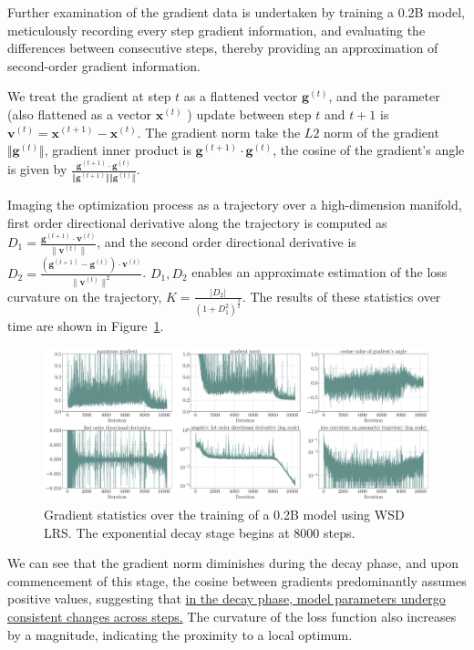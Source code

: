 Further examination of the gradient data is undertaken by training a 0.2B model, meticulously recording every step gradient information, and evaluating the differences between consecutive steps, thereby providing an approximation of second-order gradient information.

We treat the gradient at step $t$ as a flattened vector $\mathbf{g}^{(t)}$, and the parameter (also flattened as a vector $\mathbf{x}^{(t)}$ ) update between step $t$ and $t+1$ is $\mathbf{v}^{(t)} = \mathbf{x}^{(t+1)} - \mathbf{x}^{(t)}$. The gradient norm take the $L2$ norm of the gradient $\Vert\mathbf{g}^{(t)} \Vert$, gradient inner product is $\mathbf{g}^{(t+1)} \cdot \mathbf{g}^{(t)}$, the cosine of the gradient's angle is given by $\frac{\mathbf{g}^{(t+1)} \cdot \mathbf{g}^{(t)}}  {\Vert\mathbf{g}^{(t+1)} \Vert \Vert\mathbf{g}^{(t)} \Vert}$.

Imaging the optimization process as a trajectory over a high-dimension manifold, first order directional derivative along the trajectory is computed as $D_1 = \frac{\mathbf{g}^{(t+1)} \cdot \mathbf{v}^{(t)}}{\|\mathbf{v}^{(t)}\|}
$, and the second order directional derivative is $D_2 = \frac{(\mathbf{g}^{(t+1)} - \mathbf{g}^{(t)}) \cdot \mathbf{v}^{(t)}}{\|\mathbf{v}^{(t)}\|^2}$. $D_1, D_2$ enables an approximate estimation of the loss curvature on the trajectory, $K = \frac{|D_2|}{(1 + D_1^2)^{\frac{3}{2}}}$. The results of these statistics over time are shown in Figure~\ref{fig:grad}.

\begin{figure}[htbp]
    \centering
    \includegraphics[width=1.0\linewidth]{Fig/grad.pdf}
    \caption{Gradient statistics over the training of a 0.2B model using WSD LRS. The exponential decay stage begins at 8000 steps.}
    \label{fig:grad}
\end{figure}

We can see that the gradient norm diminishes during the decay phase, and upon commencement of this stage, the cosine between gradients predominantly assumes positive values, suggesting that \uline{in the decay phase, model parameters undergo consistent changes across steps.} The curvature of the loss function also increases by a magnitude, indicating the proximity to a local optimum.

